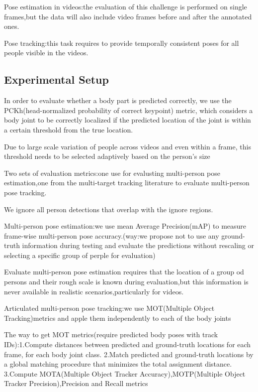 \documentclass[11pt]{article}
\begin{document}
Pose estimation in videos:the evaluation of this challenge is performed on single frames,but the data will also include video frames before and after the annotated ones.

Pose tracking:this task requires to provide temporally consistent poses for all people visible in the videos.
\subsection{Experimental Setup}

In order to evaluate whether a body part is predicted correctly, we use the PCKh(head-normalized probability of correct keypoint) metric, which considers a body joint to be correctly localized if the predicted location of the joint is within a certain threshold from the true location.

Due to large scale variation of people across videos and even within a frame, this threshold needs to be selected adaptively based on the person's size

Two sets of evaluation metrics:one use for evalusting multi-person pose estimation,one from the multi-target tracking literature to evaluate multi-person pose tracking.

We ignore all person detections that overlap with the ignore regions.

Multi-person pose estimation:we use mean Average Precision(mAP) to measure frame-wise multi-person pose accuracy.(way:we propose not to use any ground-truth information during testing and evaluate the predictions without rescaling or selecting a specific group of perple for evaluation)

Evaluate multi-person pose estimation requires that the location of a group od persons and their rough scale is known during evaluation,but this information is never available in realistic scenarios,particularly for videos.

Articulated multi-person pose tracking:we use MOT(Multiple Object Tracking)metrics and  apple them independently to each of the body joints

The way to get MOT metrics(require predicted body poses with track IDs):1.Compute distances between predicted and ground-truth locations for each frame, for each body joint class. 2.Match predicted and ground-truth locations by a global matching procedure that minimizes the total assignment distance. 3.Compute MOTA(Multiple Object Tracker Accuracy),MOTP(Multiple Object Tracker Precision),Precision and Recall metrics
\end{document}
